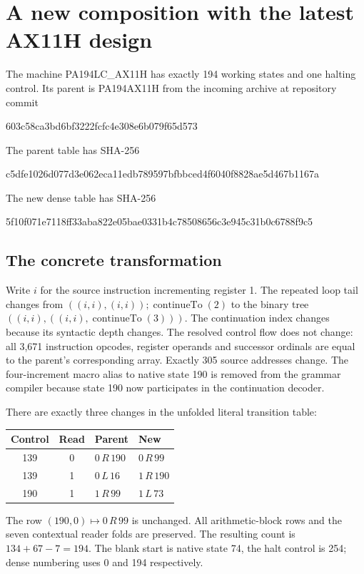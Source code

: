 \section{A new composition with the latest AX11H design}
The machine PA194LC\_AX11H has exactly 194 working states and one halting
control. Its parent is PA194AX11H from the incoming archive at repository
commit
\begin{center}\small\ttfamily
603c58ca3bd6bf3222fcfc4e308e6b079f65d573
\end{center}
The parent table has SHA-256
\begin{center}\small\ttfamily
c5dfe1026d077d3e062eca11edb789597bfbbced4f6040f8828ae5d467b1167a
\end{center}
The new dense table has SHA-256
\begin{center}\small\ttfamily
5f10f071e7118ff33aba822e05bae0331b4c78508656c3e945c31b0c6788f9c5
\end{center}

\subsection{The concrete transformation}
Write $i$ for the source instruction incrementing register 1. The repeated
loop tail changes from $((i,i),(i,i));\operatorname{continueTo}(2)$ to the
binary tree $((i,i),((i,i),\operatorname{continueTo}(3)))$. The continuation
index changes because its syntactic depth changes. The resolved control
flow does not change: all 3,671 instruction opcodes, register operands and
successor ordinals are equal to the parent's corresponding array.
Exactly 305 source addresses change. The four-increment macro alias to
native state 190 is removed from the grammar compiler because state 190
now participates in the continuation decoder.

There are exactly three changes in the unfolded literal transition table:
\begin{center}
\begin{tabular}{ccll}
Control&Read&Parent&New\\\hline
139&0&$0\,R\,190$&$0\,R\,99$\\
139&1&$0\,L\,16$&$1\,R\,190$\\
190&1&$1\,R\,99$&$1\,L\,73$
\end{tabular}
\end{center}
The row $(190,0)\mapsto0\,R\,99$ is unchanged. All arithmetic-block rows
and the seven contextual reader folds are preserved. The resulting count
is $134+67-7=194$. The blank start is native state 74, the halt control is
254; dense numbering uses 0 and 194 respectively.

